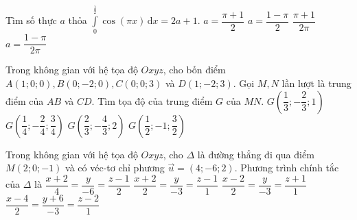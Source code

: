 \begin{ex}%
	Tìm số thực $a$ thỏa $\displaystyle\int\limits_{0}^{\frac{1}{2}}{\cos \left(\pi x\right)\mathrm{\,d}x=2a + 1}$. 
	\choice
	{$a=\dfrac{\pi + 1}{2}$}
	{$a=\dfrac{1 - \pi}{2}$}
	{$\dfrac{\pi + 1}{2\pi}$}
	{\True $a=\dfrac{1 - \pi}{2\pi}$}
\end{ex}

\begin{ex}%
	Trong không gian với hệ tọa độ $Oxyz$, cho bốn điểm $A\left(1; 0; 0\right), B\left(0; - 2; 0\right), C\left(0; 0; 3\right)$ và $D\left(1; - 2; 3\right)$. Gọi $M, N$ lần lượt là trung điểm của $AB$ và $CD$. Tìm tọa độ của trung điểm $G$ của $MN$. 
	\choice
	{$G\left(\dfrac{1}{3}; - \dfrac{2}{3}; 1\right)$}
	{$G\left(\dfrac{1}{4}; - \dfrac{2}{4}; \dfrac{3}{4}\right)$}
	{$G\left(\dfrac{2}{3}; - \dfrac{4}{3}; 2\right)$}
	{\True $G\left(\dfrac{1}{2}; - 1; \dfrac{3}{2}\right)$}
\end{ex}

\begin{ex}%
	Trong không gian với hệ tọa độ $Oxyz$, cho $\Delta $ là đường thẳng đi qua điểm $M\left(2; 0; - 1\right)$ và có véc-tơ chỉ phương $\overrightarrow{u}=\left(4; - 6; 2\right)$. Phương trình chính tắc của $\Delta $ là 
	\choice
	{$\dfrac{x + 2}{4}=\dfrac{y}{- 6}=\dfrac{z - 1}{2}$}
	{$\dfrac{x + 2}{2}=\dfrac{y}{- 3}=\dfrac{z - 1}{1}$}
	{\True $\dfrac{x - 2}{2}=\dfrac{y}{- 3}=\dfrac{z + 1}{1}$}
	{$\dfrac{x - 4}{2}=\dfrac{y + 6}{- 3}=\dfrac{z - 2}{1}$}
\end{ex}

